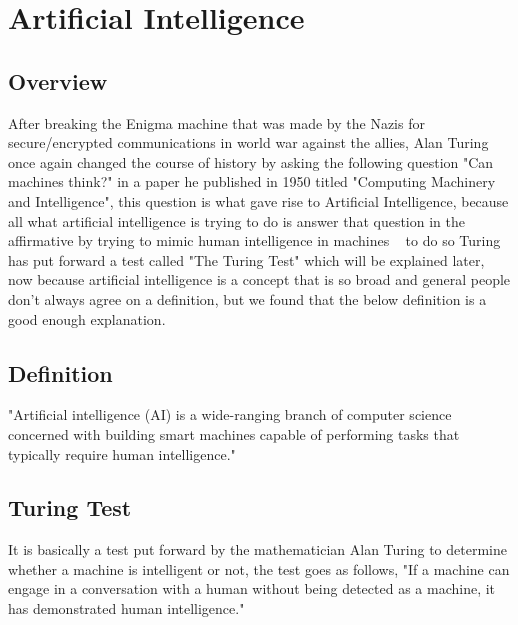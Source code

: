 \section{Artificial Intelligence}
\subsection{Overview} 
        After breaking the Enigma machine that was made by the Nazis for secure/encrypted communications in world war against the allies, Alan Turing once again changed the course of history by asking the following question "Can machines think?" in a paper he published in 1950 titled "Computing Machinery and Intelligence", this question is what gave rise to Artificial Intelligence, because all what artificial intelligence is trying to do is answer that question in the affirmative by trying to mimic human intelligence in machines ~\cite{ai} to do so Turing has put forward a test called "The Turing Test" which will be explained later, now because artificial intelligence is a concept that is  so broad and general people don't always agree on a definition, but we found that the below definition is a good enough explanation.
        
    \subsection{Definition}
        "Artificial intelligence (AI) is a wide-ranging branch of computer science concerned with building smart machines capable of performing tasks that typically require human intelligence." ~\cite{ai}

    \subsection{Turing Test}
        It is basically a test put forward by the mathematician Alan Turing to determine whether a machine is intelligent or not, the test goes as follows, "If a machine can engage in a conversation with a human without being detected as a machine, it has demonstrated human intelligence." ~\cite{turing}
    
